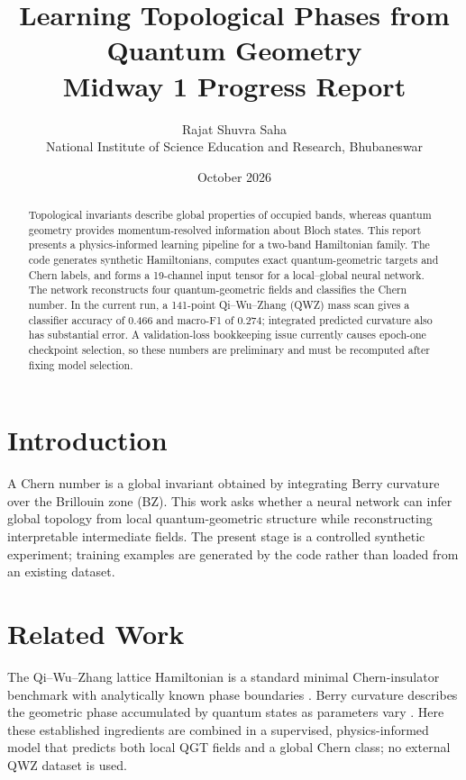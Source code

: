 \documentclass[10pt,twocolumn]{article}
\title{\vspace{-1.4em}\bfseries Learning Topological Phases from Quantum Geometry\\[-1pt]
\large Midway 1 Progress Report}
\author{Rajat Shuvra Saha\\[-1pt]\normalsize National Institute of Science Education and Research, Bhubaneswar}
\date{October 2026}
\begin{document}
\maketitle
\vspace{-1.2em}

\begin{abstract}
Topological invariants describe global properties of occupied bands, whereas quantum geometry provides momentum-resolved information about Bloch states. This report presents a physics-informed learning pipeline for a two-band Hamiltonian family. The code generates synthetic Hamiltonians, computes exact quantum-geometric targets and Chern labels, and forms a 19-channel input tensor for a local--global neural network. The network reconstructs four quantum-geometric fields and classifies the Chern number. In the current run, a 141-point Qi--Wu--Zhang (QWZ) mass scan gives a classifier accuracy of 0.466 and macro-F1 of 0.274; integrated predicted curvature also has substantial error. A validation-loss bookkeeping issue currently causes epoch-one checkpoint selection, so these numbers are preliminary and must be recomputed after fixing model selection.
\end{abstract}

\section{Introduction}
A Chern number is a global invariant obtained by integrating Berry curvature over the Brillouin zone (BZ). This work asks whether a neural network can infer global topology from local quantum-geometric structure while reconstructing interpretable intermediate fields. The present stage is a controlled synthetic experiment; training examples are generated by the code rather than loaded from an existing dataset.

\section{Related Work}
The Qi--Wu--Zhang lattice Hamiltonian is a standard minimal Chern-insulator benchmark with analytically known phase boundaries \cite{qi2006}. Berry curvature describes the geometric phase accumulated by quantum states as parameters vary \cite{berry1984}. Here these established ingredients are combined in a supervised, physics-informed model that predicts both local QGT fields and a global Chern class; no external QWZ dataset is used.
\end{document}
